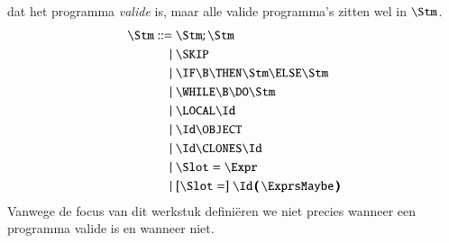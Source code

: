 dat het programma \emph{valide} is, maar alle valide programma's zitten wel in $\Stm$.
\begin{align*}
  \Stm \GrammarDef \Stm; \Stm \\
  \GrammarOr \SKIP \\
  \GrammarOr \IF \B \THEN \Stm \ELSE \Stm \\
  \GrammarOr \WHILE \B \DO \Stm \\
  \GrammarOr \LOCAL \Id \\
  \GrammarOr \Id \OBJECT \\
  \GrammarOr \Id \CLONES \Id \\
  \GrammarOr \Slot = \Expr \\
  \GrammarOr \GrammarOpt{\Slot =} \Id\,\pmb{(}\,\ExprsMaybe\,\pmb{)} \\
\end{align*}
Vanwege de focus van dit werkstuk definiëren we niet precies wanneer een programma valide is en wanneer niet.


